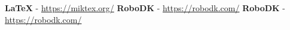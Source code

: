 \textbf{\LaTeX} - \href{https://miktex.org/}{https://miktex.org/}\newline
\textbf{RoboDK} - \href{https://robodk.com/}{https://robodk.com/}\newline
\textbf{RoboDK} - \href{https://robodk.com/}{https://robodk.com/}\newline